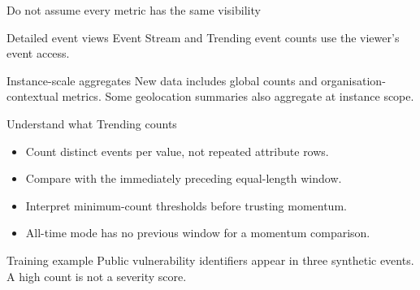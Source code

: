 \begin{frame}{Do not assume every metric has the same visibility}
    \begin{block}{Detailed event views}
        Event Stream and Trending event counts use the viewer's event access.
    \end{block}
    \begin{block}{Instance-scale aggregates}
        New data includes global counts and organisation-contextual metrics.
        Some geolocation summaries also aggregate at instance scope.
    \end{block}
\end{frame}

\begin{frame}{Understand what Trending counts}
    \begin{itemize}
        \item Count distinct events per value, not repeated attribute rows.
        \item Compare with the immediately preceding equal-length window.
        \item Interpret minimum-count thresholds before trusting momentum.
        \item All-time mode has no previous window for a momentum comparison.
    \end{itemize}
    \begin{block}{Training example}
        Public vulnerability identifiers appear in three synthetic events.
        A high count is not a severity score.
    \end{block}
\end{frame}

